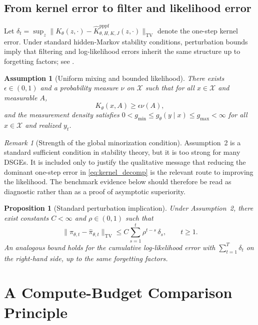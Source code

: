 \documentclass[11pt]{article}
\newtheorem{assumption}{Assumption}
\newtheorem{proposition}{Proposition}
\theoremstyle{remark}
\newtheorem{remark}{Remark}
\begin{document}
\subsection{From kernel error to filter and likelihood error}

Let $\delta_t=\sup_{z}\|K_\theta(z,\cdot)-\widehat K_{\theta,H,K,J}^{\mathrm{pppf}}(z,\cdot)\|_{\mathrm{TV}}$ denote the one-step kernel error.
Under standard hidden-Markov stability conditions, perturbation bounds imply that filtering and log-likelihood errors inherit the same structure up to forgetting factors; see \citet{DelMoral2004,Whiteley2013,KantasDoucetSinghMaciejowski2015}.

\begin{assumption}[Uniform mixing and bounded likelihood]
There exists $\epsilon\in(0,1)$ and a probability measure $\nu$ on $\mathcal{X}$ such that for all $x\in\mathcal{X}$ and measurable $A$,
\[
K_\theta(x,A)\ge \epsilon \nu(A),
\]
and the measurement density satisfies $0< g_{\min}\le g_\theta(y\mid x)\le g_{\max}<\infty$ for all $x\in\mathcal{X}$ and realized $y_t$.
\end{assumption}

\begin{remark}[Strength of the global minorization condition]
Assumption~2 is a standard sufficient condition in stability theory, but it is too strong for many DSGEs.
It is included only to justify the qualitative message that reducing the dominant one-step error in \eqref{eq:kernel_decomp} is the relevant route to improving the likelihood.
The benchmark evidence below should therefore be read as diagnostic rather than as a proof of asymptotic superiority.
\end{remark}

\begin{proposition}[Standard perturbation implication]
Under Assumption~2, there exist constants $C<\infty$ and $\rho\in(0,1)$ such that
\[
\|\pi_{\theta,t}-\widehat \pi_{\theta,t}\|_{\mathrm{TV}}
\le
C \sum_{s=1}^{t} \rho^{t-s}\, \delta_s,
\qquad t\ge 1.
\]
An analogous bound holds for the cumulative log-likelihood error with $\sum_{t=1}^T \delta_t$ on the right-hand side, up to the same forgetting factors.
\end{proposition}

\section{A Compute-Budget Comparison Principle}
\label{sec:dominance}
\end{document}
